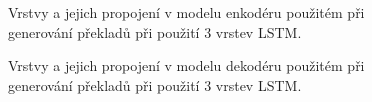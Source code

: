 \begin{figure}[H]
    \begin{center}
    \end{center}
	\caption{Vrstvy a jejich propojení v modelu enkodéru použitém při generování překladů při použití 3 vrstev LSTM.}
	\label{img:encodermodel}
\end{figure}


\begin{figure}[H]
    \begin{center}
    \end{center}
	\caption{Vrstvy a jejich propojení v modelu dekodéru použitém při generování překladů při použití 3 vrstev LSTM.}
	\label{img:decodermodel}
\end{figure}


